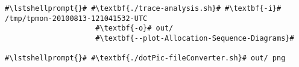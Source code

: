 \begin{lstlisting}[caption=Command to produce a sequence diagram,label=lst:traceAnalysis:sequenceDiagram]
#\lstshellprompt{}# #\textbf{./trace-analysis.sh}# #\textbf{-i}# /tmp/tpmon-20100813-121041532-UTC
                     #\textbf{-o}# out/
                     #\textbf{--plot-Allocation-Sequence-Diagrams}#
					  
#\lstshellprompt{}# #\textbf{./dotPic-fileConverter.sh}# out/ png			  
\end{lstlisting}
